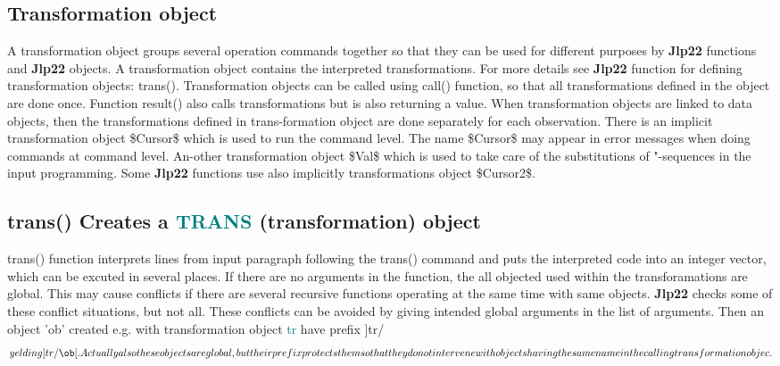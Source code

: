 {\subsection{Transformation object} 
\label{transo} 
A transformation object groups several operation commands together so that they 
can be used for different purposes by \textbf{Jlp22} functions and \textbf{Jlp22} objects. A 
transformation object contains the interpreted transformations. For more details 
see \textbf{Jlp22} function for defining transformation objects: \textcolor{VioletRed}{trans}(). 
Transformation objects can be called using \textcolor{VioletRed}{call}() function, so that all 
transformations defined in the object are done once. Function result() also calls 
transformations but is also returning a value. When transformation objects are 
linked to data objects, then the transformations defined in trans-formation object 
are done separately for each observation. 
There is an implicit transformation object \$Cursor\$ which is used to run the 
command level. The name \$Cursor\$ may appear in error messages when doing 
commands at command level.  An-other transformation object \$Val\$ which is used to 
take care of the substitutions of "-sequences in the input programming. Some \textbf{Jlp22} 
functions use also implicitly transformations object \$Cursor2\$. 
\subsection{\textcolor{VioletRed}{trans}() Creates a \textcolor{teal}{TRANS} (transformation) object} 
\label{trans} 
\textcolor{VioletRed}{trans}() function interprets lines from input paragraph following the \textcolor{VioletRed}{trans}() command and puts the 
interpreted code into an integer vector, which can be excuted in several places. 
If there are no arguments in the function, the all objected used within the 
transforamations are global. This may cause conflicts if there are several recursive 
functions operating at the same time with same objects. \textbf{Jlp22} checks some of 
these conflict situations, but not all.  These conflicts can be avoided by giving 
intended global arguments  in the list of arguments. 
Then an object 'ob' created e.g. with transformation object \textcolor{teal}{tr} have prefix 
]tr/\[ yelding ]tr/\ob[. Actually also these objects are global, but their prefix 
protects them so that they do not intervene with objects having the same name in the 
calling transformation objec. 
 
\]}
